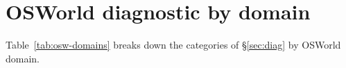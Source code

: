 \section{OSWorld diagnostic by domain}
Table~\ref{tab:osw-domains} breaks down the categories of \S\ref{sec:diag} by OSWorld domain.
\FloatBarrier
